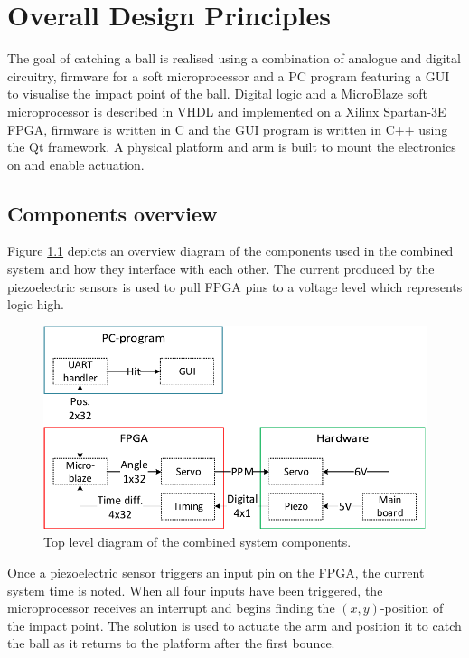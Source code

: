 \chapter{Overall Design Principles} %
\label{chap:overall_design_principles}
The goal of catching a ball is realised using a combination of analogue and digital circuitry, firmware for a soft microprocessor and a PC program featuring a GUI to visualise the impact point of the ball.
Digital logic and a MicroBlaze soft microprocessor is described in VHDL and implemented on a Xilinx Spartan-3E FPGA, firmware is written in C and the GUI program is written in C++ using the Qt framework.
A physical platform and arm is built to mount the electronics on and enable actuation.

	\section{Components overview}
	Figure \ref{fig:overview} depicts an overview diagram of the components used in the combined system and how they interface with each other.
	The current produced by the piezoelectric sensors is used to pull FPGA pins to a voltage level which represents logic high.
	\begin{figure}[htb]
		\centering
		\includegraphics[width=.96\textwidth]{figures/overview}
		\caption{Top level diagram of the combined system components.}
		\label{fig:overview}
	\end{figure}

	Once a piezoelectric sensor triggers an input pin on the FPGA, the current system time is noted.
	When all four inputs have been triggered, the microprocessor receives an interrupt and begins finding the $(x,y)$-position of the impact point.
	The solution is used to actuate the arm and position it to catch the ball as it returns to the platform after the first bounce.

